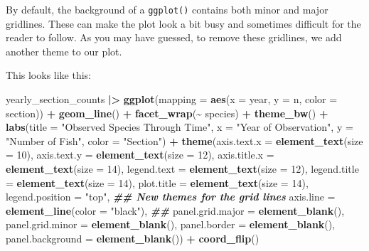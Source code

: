 \documentclass[
  10pt,
  letterpaper,
  twoside,
  openright]{book}
\newenvironment{Shaded}{\begin{snugshade}}{\end{snugshade}}
\newcommand{\AttributeTok}[1]{\textcolor[rgb]{0.13,0.29,0.53}{#1}}
\newcommand{\DecValTok}[1]{\textcolor[rgb]{0.00,0.00,0.81}{#1}}
\newcommand{\DocumentationTok}[1]{\textcolor[rgb]{0.56,0.35,0.01}{\textbf{\textit{#1}}}}
\newcommand{\FunctionTok}[1]{\textcolor[rgb]{0.13,0.29,0.53}{\textbf{#1}}}
\newcommand{\NormalTok}[1]{#1}
\newcommand{\SpecialCharTok}[1]{\textcolor[rgb]{0.81,0.36,0.00}{\textbf{#1}}}
\newcommand{\StringTok}[1]{\textcolor[rgb]{0.31,0.60,0.02}{#1}}
\begin{document}
By default, the background of a \texttt{ggplot()} contains both minor
and major gridlines. These can make the plot look a bit busy and
sometimes difficult for the reader to follow. As you may have guessed,
to remove these gridlines, we add another theme to our plot.

This looks like this:

\begin{Shaded}
\begin{Highlighting}[]
\NormalTok{yearly\_section\_counts }\SpecialCharTok{|\textgreater{}}
 \FunctionTok{ggplot}\NormalTok{(}\AttributeTok{mapping =} \FunctionTok{aes}\NormalTok{(}\AttributeTok{x =}\NormalTok{ year, }\AttributeTok{y =}\NormalTok{ n, }\AttributeTok{color =}\NormalTok{ section)) }\SpecialCharTok{+}
     \FunctionTok{geom\_line}\NormalTok{() }\SpecialCharTok{+}
     \FunctionTok{facet\_wrap}\NormalTok{(}\SpecialCharTok{\textasciitilde{}}\NormalTok{ species) }\SpecialCharTok{+}
     \FunctionTok{theme\_bw}\NormalTok{() }\SpecialCharTok{+}
  \FunctionTok{labs}\NormalTok{(}\AttributeTok{title =} \StringTok{"Observed Species Through Time"}\NormalTok{,}
       \AttributeTok{x =} \StringTok{"Year of Observation"}\NormalTok{,}
       \AttributeTok{y =} \StringTok{"Number of Fish"}\NormalTok{,  }
       \AttributeTok{color =} \StringTok{"Section"}\NormalTok{)  }\SpecialCharTok{+}
  \FunctionTok{theme}\NormalTok{(}\AttributeTok{axis.text.x =} \FunctionTok{element\_text}\NormalTok{(}\AttributeTok{size =} \DecValTok{10}\NormalTok{), }
        \AttributeTok{axis.text.y =} \FunctionTok{element\_text}\NormalTok{(}\AttributeTok{size =} \DecValTok{12}\NormalTok{), }
        \AttributeTok{axis.title.x =} \FunctionTok{element\_text}\NormalTok{(}\AttributeTok{size =} \DecValTok{14}\NormalTok{),}
        \AttributeTok{legend.text =} \FunctionTok{element\_text}\NormalTok{(}\AttributeTok{size =} \DecValTok{12}\NormalTok{),}
        \AttributeTok{legend.title =} \FunctionTok{element\_text}\NormalTok{(}\AttributeTok{size =} \DecValTok{14}\NormalTok{),}
        \AttributeTok{plot.title =} \FunctionTok{element\_text}\NormalTok{(}\AttributeTok{size =} \DecValTok{14}\NormalTok{), }
        \AttributeTok{legend.position =} \StringTok{"top"}\NormalTok{, }
        \DocumentationTok{\#\# New themes for the grid lines}
        \AttributeTok{axis.line =} \FunctionTok{element\_line}\NormalTok{(}\AttributeTok{color =} \StringTok{"black"}\NormalTok{),}
        \DocumentationTok{\#\# }
        \AttributeTok{panel.grid.major =} \FunctionTok{element\_blank}\NormalTok{(),}
        \AttributeTok{panel.grid.minor =} \FunctionTok{element\_blank}\NormalTok{(),}
        \AttributeTok{panel.border =} \FunctionTok{element\_blank}\NormalTok{(), }
        \AttributeTok{panel.background =} \FunctionTok{element\_blank}\NormalTok{()) }\SpecialCharTok{+} 
  \FunctionTok{coord\_flip}\NormalTok{()}
\end{Highlighting}
\end{Shaded}
\end{document}
